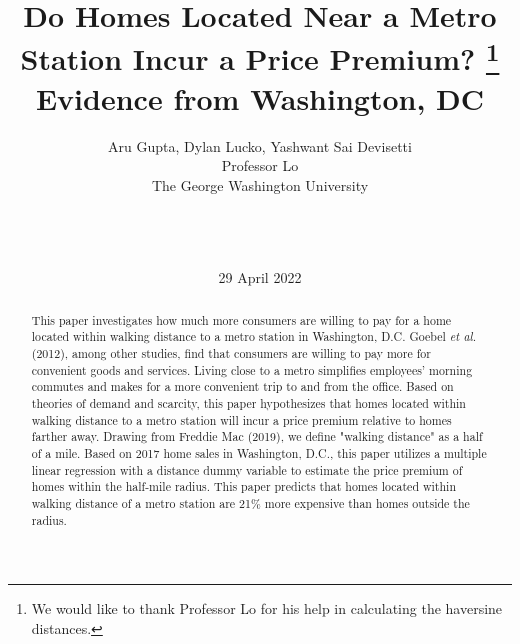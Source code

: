 \documentclass[12pt]{report}
\begin{document}
\title{%
Do Homes Located Near a Metro Station Incur a Price Premium? \thanks{{We would like to thank Professor Lo for his help in calculating the haversine distances.}} \\ 
\Large
Evidence from Washington, DC}
\author{Aru Gupta, Dylan Lucko, Yashwant Sai Devisetti \\ Professor Lo\\The George Washington University\\  \\  \\  \\ }
\date{29 April 2022}
\maketitle
\begin{abstract}
\smallskip
This paper investigates how much more consumers are willing to pay for a home located within walking distance to a metro station in Washington, D.C. Goebel \emph{et al.} (2012), among other studies, find that consumers are willing to pay more for convenient goods and services. Living close to a metro simplifies employees' morning commutes and makes for a more convenient trip to and from the office. Based on theories of demand and scarcity, this paper hypothesizes that homes located within walking distance to a metro station will incur a price premium relative to homes farther away. Drawing from Freddie Mac (2019), we define "walking distance" as a half of a mile. Based on 2017 home sales in Washington, D.C., this paper utilizes a multiple linear regression with a distance dummy variable to estimate the price premium of homes within the half-mile radius. This paper predicts that homes located within walking distance of a metro station are 21\% more expensive than homes outside the radius.

\end{abstract}
\end{document}
